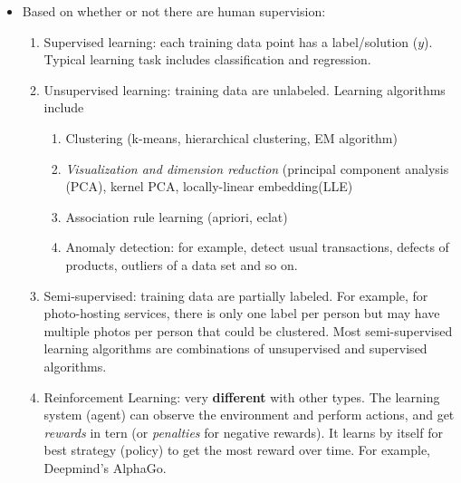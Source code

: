 \documentclass[12pt,oneside,a4paper]{article}
\numberwithin{equation}{section}
\begin{document}
\begin{itemize}
\item Based on whether or not there are human supervision: 
\begin{enumerate}
\item Supervised learning: each training data point has a label/solution ($y$). Typical learning task includes classification and regression. 
\item Unsupervised learning: training data are unlabeled. Learning algorithms include 
\begin{enumerate}
\item Clustering (k-means, hierarchical clustering, EM algorithm)
\item \emph{Visualization and dimension reduction} (principal component analysis (PCA), kernel PCA, locally-linear embedding(LLE)
\item Association rule learning (apriori, eclat)
\item Anomaly detection: for example, detect usual transactions, defects of products, outliers of a data set and so on.  
\end{enumerate}
\item Semi-supervised: training data are partially labeled. For example, for photo-hosting services, there is only one label per person but may have multiple photos per person that could be clustered. Most semi-supervised learning algorithms are combinations of unsupervised and supervised algorithms.
\item Reinforcement Learning: very \textbf{different} with other types. The learning system (agent) can observe the environment and perform actions, and get \emph{rewards} in tern (or \emph{penalties} for negative rewards). It learns by itself for best strategy (policy) to get the most reward over time. For example, Deepmind's AlphaGo.
\end{enumerate}


\end{itemize}
\end{document}
